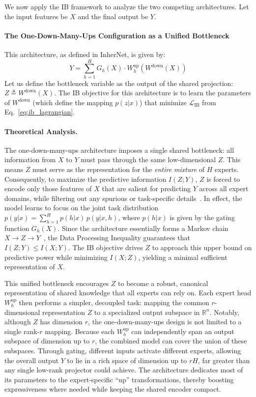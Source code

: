 \documentclass{article} %
\begin{document}
We now apply the IB framework to analyze the two competing architectures. Let the input features be $X$ and the final output be $Y$.

\paragraph{The One-Down-Many-Ups Configuration as a Unified Bottleneck}

This architecture, as defined in InherNet, is given by:
\begin{equation}
    Y = \sum_{h=1}^{H} G_h(X) \cdot W^{\text{up}}_h\left(W^{\text{down}}(X)\right)
    \label{eq:one_down}
\end{equation}
Let us define the bottleneck variable as the output of the shared projection: $Z \triangleq W^{\text{down}}(X)$. The IB objective for this architecture is to learn the parameters of $W^{\text{down}}$ (which define the mapping $p(z|x)$) that minimize $\mathcal{L}_{\text{IB}}$ from Eq.~\ref{eq:ib_lagrangian}.

\paragraph{Theoretical Analysis.}
The one-down-many-ups architecture imposes a single shared bottleneck: all information from $X$ to $Y$ must pass through the same low-dimensional $Z$. This means $Z$ must serve as the representation for the \emph{entire mixture} of $H$ experts. Consequently, to maximize the predictive information $I(Z; Y)$, $Z$ is forced to encode only those features of $X$ that are salient for predicting $Y$ across all expert domains, while filtering out any spurious or task-specific details~\citep{ye2024spurious,zhou2025collaborative,zhou2025disentangled,lv2025grasp,zhou2025multimodal}. In effect, the model learns to focus on the joint task distribution $p(y|x) = \sum_{h=1}^H p(h|x)\,p(y|x,h)$, where $p(h|x)$ is given by the gating function $G_h(X)$. Since the architecture essentially forms a Markov chain $X \to Z \to Y$~\citep{norris1998markov}, the Data Processing Inequality guarantees that $I(Z; Y) \le I(X; Y)$. The IB objective drives $Z$ to approach this upper bound on predictive power while minimizing $I(X; Z)$, yielding a minimal sufficient representation of $X$.

This unified bottleneck encourages $Z$ to become a robust, canonical representation of shared knowledge that all experts can rely on. Each expert head $W^{\text{up}}_h$ then performs a simpler, decoupled task: mapping the common $r$-dimensional representation $Z$ to a specialized output subspace in $\mathbb{R}^n$. Notably, although $Z$ has dimension $r$, the one-down-many-ups design is not limited to a single rank-$r$ mapping. Because each $W^{\text{up}}_h$ can independently span an output subspace of dimension up to $r$, the combined model can cover the union of these subspaces. Through gating, different inputs activate different experts, allowing the overall output $Y$ to lie in a rich space of dimension up to $rH$, far greater than any single low-rank projector could achieve. The architecture dedicates most of its parameters to the expert-specific “up” transformations, thereby boosting expressiveness where needed while keeping the shared encoder compact.
\end{document}
